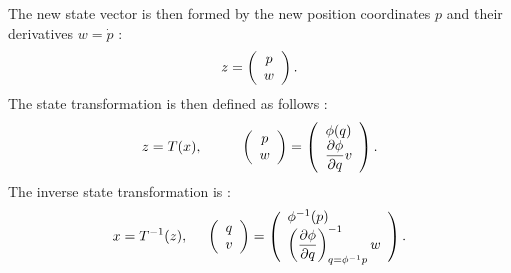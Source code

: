 The new state vector is then formed by the new position coordinates $p$ and their derivatives $w = \dot p$ :
$$
z = \bma{c} p\\w \ema.
$$
The state transformation is then defined as follows :
\begin{equation*} \begin{split}
 z = T(x), \hspace*{10mm} \bma{c}p\\w  \ema = \bma{c} \phi(q)\\
\dfrac{\partial \phi}{\partial q} v \ema.
\end{split} \end{equation*}
The inverse state transformation is :
$$
x=T^{-1}(z), \hd \bma{c}q\\v \ema = \bma{l} \phi^{-1}(p) \\
\left(\dfrac{\partial \phi}{\partial q}\right )^{-1}_{q = \phi^{-1} p}w
\ema.
$$

